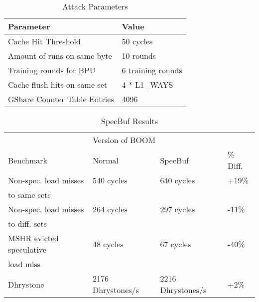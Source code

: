 \begin{table}
\centering
\caption{Attack Parameters}
\label{tab:attack-params}
\begin{tabular}{@{} *2l @{}} \toprule
    Parameter                    & Value \\ \midrule
    Cache Hit Threshold          & 50 cycles \\
    Amount of runs on same byte  & 10 rounds \\
    Training rounds for BPU      & 6 training rounds \\
    Cache flush hits on same set & 4 * L1\_WAYS \\
    GShare Counter Table Entries & 4096 \\ \bottomrule
\end{tabular}
\end{table} 

\begin{table}
\centering
\caption{SpecBuf Results}
\label{tab:spec-buf-results}
\begin{tabular}{@{} *4l @{}} \toprule
    & \multicolumn{2}{l}{Version of BOOM} & \\
    Benchmark                           & Normal & SpecBuf & \% Diff.\\ \midrule
    Non-spec. load misses   & 540 cycles & 640 cycles & +19\%    \\
    to same sets            &            &            & \\ \midrule
    Non-spec. load misses   & 264 cycles & 297 cycles & -11\%    \\ 
    to diff. sets           &            &            & \\ \midrule
    MSHR evicted speculative & 48 cycles & 67 cycles & -40\%    \\
    load miss                &            &            & \\ \midrule
    Dhrystone                           & 2176 Dhrystones/s & 2216 Dhrystones/s & +2\%\\ \bottomrule
\end{tabular}
\end{table}

